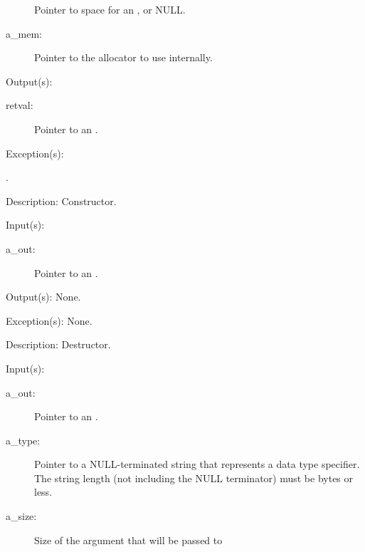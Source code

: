 \begin{capi}
\begin{capilist}
\begin{description}
			Pointer to space for an , or NULL.
		\item[a\_mem: ]
			Pointer to the allocator to use internally.
		\end{description}
	\item[Output(s): ]
		\begin{description}\item[]
		\item[retval: ]
			Pointer to an .
		\end{description}
	\item[Exception(s): ]
		\begin{description}\item[]
		\item[.]
		\end{description}
	\item[Description: ]
		Constructor.
	\end{capilist}
\label{out_delete}
	\begin{capilist}
	\item[Input(s): ]
		\begin{description}\item[]
		\item[a\_out: ]
			Pointer to an .
		\end{description}
	\item[Output(s): ] None.
	\item[Exception(s): ] None.
	\item[Description: ]
		Destructor.
	\end{capilist}
\label{out_register}
	\begin{capilist}
	\item[Input(s): ]
		\begin{description}\item[]
		\item[a\_out: ]
			Pointer to an \classname{out}.
		\item[a\_type: ]
			Pointer to a NULL-terminated string that represents a
			data type specifier.  The string length (not including
			the NULL terminator) must be
			 bytes or less.
		\item[a\_size: ]
			Size of the argument that will be passed to

\end{description}
\end{capilist}
\end{capi}
